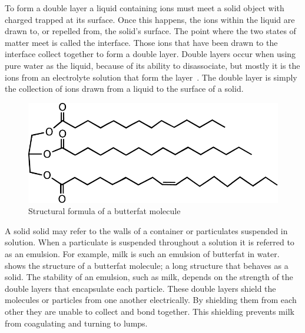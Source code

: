     To form a double layer a liquid containing ions must meet a solid object with charged trapped at its surface.
    Once this happens, the ions within the liquid are drawn to, or repelled from, the solid's surface.
    The point where the two states of matter meet is called the interface.
    Those ions that have been drawn to the interface collect together to form a double layer.
    Double layers occur when using pure water as the liquid, because of its ability to disassociate, but mostly it is the ions from an electrolyte solution that form the layer~\cite{Bruesch2004}.
    The double layer is simply the collection of ions drawn from a liquid to the surface of a solid.


    \begin{figure}
        \begin{center}
            \includegraphics[scale=0.8]{content/introduction/graphics/butterfat}
        \end{center}
        \caption{Structural formula of a butterfat molecule}
        \label{fig:butterfat}
    \end{figure}
    A solid solid may refer to the walls of a container or particulates suspended in solution.
    When a particulate is suspended throughout a solution it is referred to as an emulsion.
    For example, milk is such an emulsion of butterfat in water.
     shows the structure of a butterfat molecule; a long structure that behaves as a solid.
    The stability of an emulsion, such as milk, depends on the strength of the double layers that encapsulate each particle.
    These double layers shield the molecules or particles from one another electrically.
    By shielding them from each other they are unable to collect and bond together.
    This shielding prevents milk from coagulating and turning to lumps.


